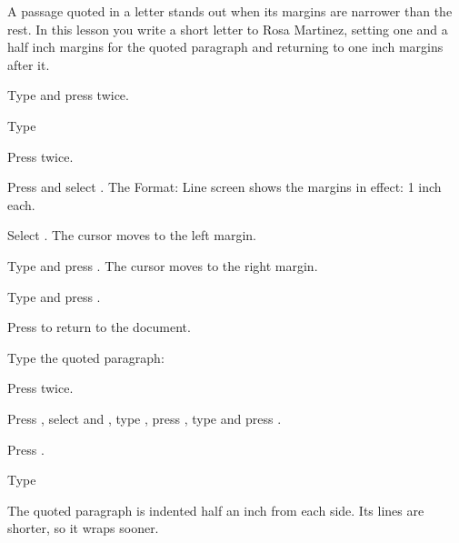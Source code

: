 A passage quoted in a letter stands out when its margins are narrower than
the rest.  In this lesson you write a short letter to Rosa Martinez, setting
one and a half inch margins for the quoted paragraph and returning to one
inch margins after it.

\begin{WPSteps}
\item Type  and press 
twice.
\item Type
\item Press  twice.
\end{WPSteps}

\begin{WPSteps}
\item Press  and select .  The
Format: Line screen shows the margins in effect: 1 inch each.
\item Select .  The cursor moves to the left margin.
\item Type  and press .  The cursor moves to the
right margin.
\item Type  and press .
\end{WPSteps}
\begin{WPSteps}[resume]
\item Press  to return to the document.
\item Type the quoted paragraph:
\item Press  twice.
\end{WPSteps}

\begin{WPSteps}
\item Press , select  and
, type , press , type
 and press .
\item Press .
\item Type 
\end{WPSteps}
The quoted paragraph is indented half an inch from each side.  Its lines are
shorter, so it wraps sooner.


